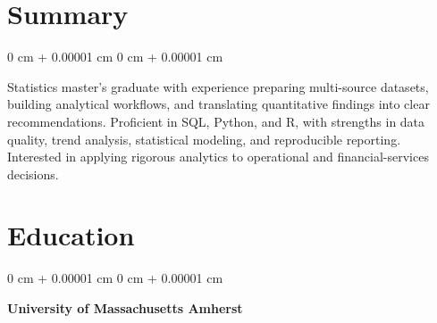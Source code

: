 \documentclass[10pt, letterpaper]{article}
\newenvironment{highlightsforbulletentries}{
    \begin{itemize}[
        topsep=0.10 cm,
        parsep=0.10 cm,
        partopsep=0pt,
        itemsep=0pt,
        leftmargin=10pt
    ]
}{
    \end{itemize}
} %
\newenvironment{onecolentry}{
    \begin{adjustwidth}{
        0 cm + 0.00001 cm
    }{
        0 cm + 0.00001 cm
    }
}{
    \end{adjustwidth}
} %
\begin{document}
    








    \section{Summary} 
        \begin{onecolentry}
         Statistics master's graduate with experience preparing multi-source datasets, building analytical workflows, and translating quantitative findings into clear recommendations. Proficient in SQL, Python, and R, with strengths in data quality, trend analysis, statistical modeling, and reproducible reporting. Interested in applying rigorous analytics to operational and financial-services decisions.
        \end{onecolentry}
        
    \section{Education}

        \begin{onecolentry}
        \textbf{University of Massachusetts Amherst}
        \end{onecolentry}
        
\end{document}
